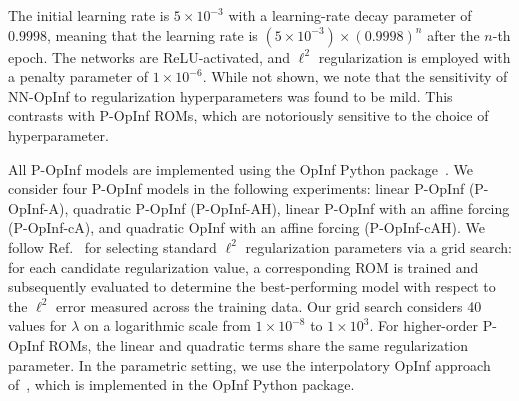 \documentclass[3p,computermodern,11pt]{elsarticle}
\numberwithin{equation}{section}
\begin{document}
The initial learning rate is $5 \times 10^{-3}$ with a learning-rate decay parameter of $0.9998$, meaning that the learning rate is $\left(5 \times 10^{-3}\right) \times (0.9998)^n$ after the $n$-th epoch.  The networks are ReLU-activated, and $\ell^2$ regularization is employed with a penalty parameter of $1 \times 10^{-6}$. While not shown, we note that the sensitivity of NN-OpInf to regularization hyperparameters was found to be mild. This contrasts with P-OpInf ROMs, which are notoriously sensitive to the choice of hyperparameter. 

All P-OpInf models are implemented using the OpInf Python package~\cite{OpInfPackage}. We consider four P-OpInf models in the following experiments: linear P-OpInf (P-OpInf-A), quadratic P-OpInf (P-OpInf-AH), linear P-OpInf with an affine forcing (P-OpInf-cA), and quadratic OpInf with an affine forcing (P-OpInf-cAH).  
We follow Ref.~\cite{McKhWi23} for selecting standard $\ell^2$ regularization parameters via a grid search: 
for each candidate regularization value, a corresponding ROM is trained and subsequently evaluated to determine the best-performing model with respect to the $\ell^2$ error measured across the training data. Our grid search considers 40 values for $\lambda$ on a logarithmic scale from $1 \times 10^{-8}$ to $1 \times 10^3$. For higher-order P-OpInf ROMs, the linear and quadratic terms share the same regularization parameter. In the parametric setting, we use the interpolatory OpInf approach of~\cite{PeWi16}, which is implemented in the OpInf Python package. 
\end{document}
